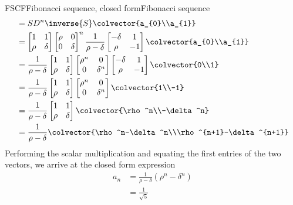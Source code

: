 \begin{example}{FSCF}{Fibonacci sequence, closed form}{Fibonacci sequence}
\begin{align*}
&=SD^n\inverse{S}\colvector{a_{0}\\a_{1}}\\
&=
\begin{bmatrix}1&1\\\rho&\delta\end{bmatrix}
\begin{bmatrix}\rho&0\\0&\delta\end{bmatrix}^n
\frac{1}{\rho-\delta}\begin{bmatrix}-\delta&1\\\rho&-1\end{bmatrix}
\colvector{a_{0}\\a_{1}}\\
&=
\frac{1}{\rho-\delta}
\begin{bmatrix}1&1\\\rho&\delta\end{bmatrix}
\begin{bmatrix}\rho^n&0\\0&\delta^n\end{bmatrix}
\begin{bmatrix}-\delta&1\\\rho&-1\end{bmatrix}
\colvector{0\\1}\\
&=
\frac{1}{\rho-\delta}
\begin{bmatrix}1&1\\\rho&\delta\end{bmatrix}
\begin{bmatrix}\rho^n&0\\0&\delta^n\end{bmatrix}
\colvector{1\\-1}\\
&=
\frac{1}{\rho-\delta}
\begin{bmatrix}1&1\\\rho&\delta\end{bmatrix}
\colvector{\rho^n\\-\delta^n}\\
&=
\frac{1}{\rho-\delta}
\colvector{\rho^n-\delta^n\\\rho^{n+1}-\delta^{n+1}}
\end{align*}
%
Performing the scalar multiplication and equating the first entries of the two vectors, we arrive at the closed form expression
%
\begin{align*}
a_n&=\frac{1}{\rho-\delta}\left(\rho^n-\delta^n\right)\\
&=\frac{1}{\sqrt{5}}

\end{align*}
\end{example}
